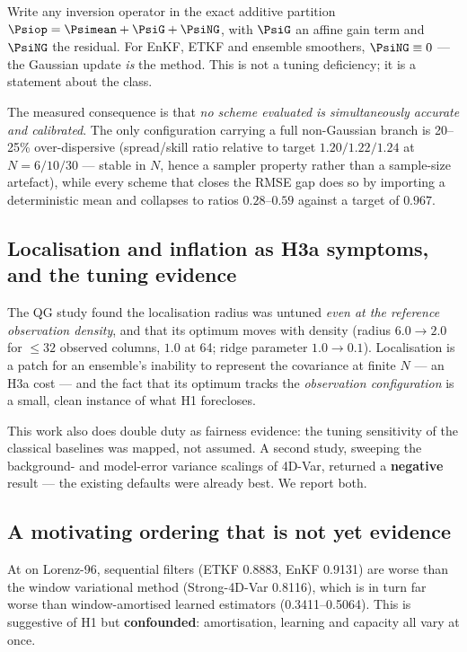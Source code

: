 Write any inversion operator in the exact additive partition
$\Psiop = \Psimean + \PsiG + \PsiNG$, with $\PsiG$ an affine gain term and
$\PsiNG$ the residual. For EnKF, ETKF and ensemble smoothers, $\PsiNG \equiv 0$
--- the Gaussian update \emph{is} the method. This is not a tuning deficiency; it
is a statement about the class.

The measured consequence is that \emph{no scheme evaluated is simultaneously
accurate and calibrated}. The only configuration carrying a full non-Gaussian
branch is 20--25\% over-dispersive (spread/skill ratio relative to target
$1.20 / 1.22 / 1.24$ at $N = 6 / 10 / 30$ --- stable in $N$, hence a sampler
property rather than a sample-size artefact), while every scheme that closes the
RMSE gap does so by importing a deterministic mean and collapses to ratios
$0.28$--$0.59$ against a target of $0.967$.

\subsection{Localisation and inflation as H3a symptoms, and the tuning evidence}
\label{sec:tuning}

The QG study found the localisation radius was untuned \emph{even at the
reference observation density}, and that its optimum moves with density
(radius $6.0 \to 2.0$ for $\leq 32$ observed columns, $1.0$ at 64; ridge
parameter $1.0 \to 0.1$). Localisation is a patch for an ensemble's inability to
represent the covariance at finite $N$ --- an H3a cost --- and the fact that its
optimum tracks the \emph{observation configuration} is a small, clean instance of
what H1 forecloses.

This work also does double duty as fairness evidence: the tuning sensitivity of
the classical baselines was mapped, not assumed. A second study, sweeping the
background- and model-error variance scalings of 4D-Var, returned a
\textbf{negative} result --- the existing defaults were already best. We report
both.

\subsection{A motivating ordering that is not yet evidence}
\label{sec:ordering}

At \Sz{} on Lorenz-96, sequential filters (ETKF 0.8883, EnKF 0.9131) are worse
than the window variational method (Strong-4D-Var 0.8116), which is in turn far
worse than window-amortised learned estimators (0.3411--0.5064). This is
suggestive of H1 but \textbf{confounded}: amortisation, learning and capacity all
vary at once.
